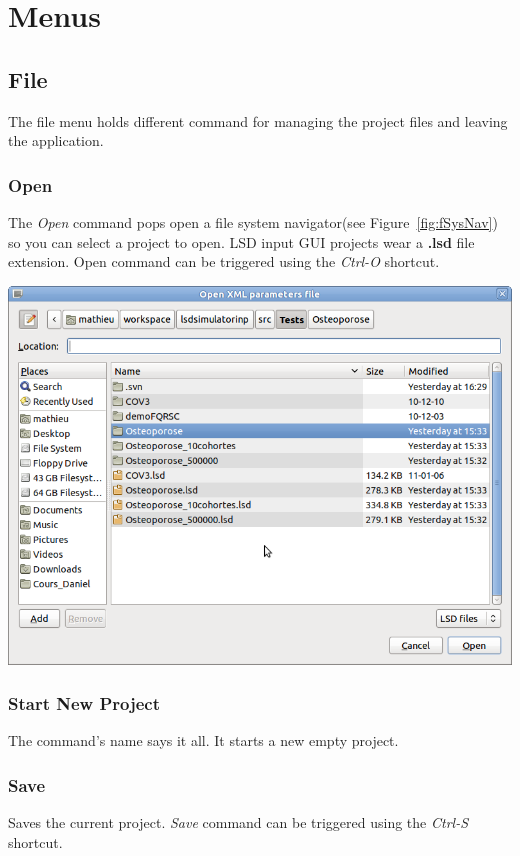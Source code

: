 \documentclass[a4paper,11pt]{report}
\begin{document}
\section{Menus}
\subsection{File}
The file menu holds different command for managing the project files and leaving the application.

\subsubsection{Open}
The \emph{Open} command pops open a file system navigator(see Figure~\ref{fig:fSysNav}) so you can select a project to open. LSD input GUI projects wear a \textbf{.lsd} file extension. Open command can be triggered using the \emph{Ctrl-O} shortcut.

\begin{center}
\includegraphics[scale=0.3]{Pictures/Menu/FileSysNav.png}
\label{fig:fSysNav}
\end{center}

\subsubsection{Start New Project}
The command's name says it all. It starts a new empty project.

\subsubsection{Save}
\label{sec:save}
Saves the current project. \emph{Save} command can be triggered using the \emph{Ctrl-S} shortcut.
\end{document}
